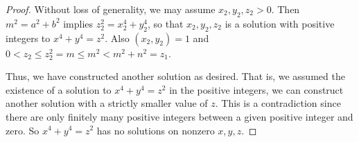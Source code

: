 \documentclass{ximera}
\begin{document}
\begin{proof}
 
	Without loss of generality, we may assume $x_2,y_2,z_2>0$. Then $m^2=a^2+b^2$ implies $z_2^2=x_2^4+y_2^4$, so that $x_2,y_2,z_2$ is a solution with positive integers to $x^4+y^4=z^2$. Also $(x_2,y_2)=1$ and $0<z_2\leq z_2^2 =m\leq m^2<m^2+n^2=z_1$.
 
	Thus, we have constructed another solution as desired. That is, we assumed the existence of a solution to $x^4+y^4=z^2$ in the positive integers, we can construct another solution with a strictly smaller value of $z$. This is a contradiction since there are only finitely many positive integers between a given positive integer and zero. So $x^4+y^4=z^2$ has no solutions on nonzero $x,y,z$.
\end{proof}
\end{document}
